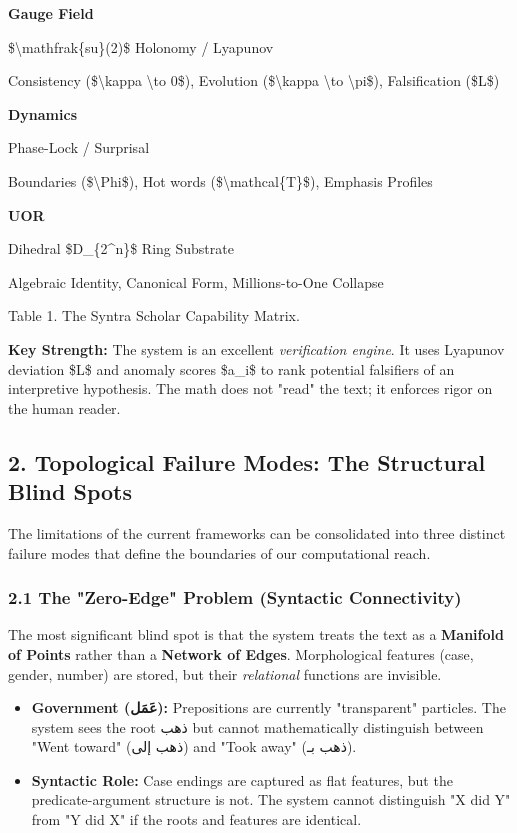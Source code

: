 \documentclass[12pt,a4paper]{article}
\providecommand{\tightlist}{\setlength{\itemsep}{0pt}\setlength{\parskip}{0pt}}
\begin{document}
\textbf{Gauge Field}

\$\textbackslash mathfrak\{su\}(2)\$ Holonomy / Lyapunov

Consistency (\$\textbackslash kappa \textbackslash to 0\$), Evolution
(\$\textbackslash kappa \textbackslash to \textbackslash pi\$),
Falsification (\$L\$)

\textbf{Dynamics}

Phase-Lock / Surprisal

Boundaries (\$\textbackslash Phi\$), Hot words
(\$\textbackslash mathcal\{T\}\$), Emphasis Profiles

\textbf{UOR}

Dihedral \$D\_\{2\^{}n\}\$ Ring Substrate

Algebraic Identity, Canonical Form, Millions-to-One Collapse

Table 1. The Syntra Scholar Capability Matrix.

\textbf{Key Strength:} The system is an excellent \emph{verification
engine}. It uses Lyapunov deviation \$L\$ and anomaly scores \$a\_i\$ to
rank potential falsifiers of an interpretive hypothesis. The math does
not "read" the text; it enforces rigor on the human reader.

\subsection{2. Topological Failure Modes: The Structural Blind
Spots}\label{blind-spots}

The limitations of the current frameworks can be consolidated into three
distinct failure modes that define the boundaries of our computational
reach.

\subsubsection{2.1 The "Zero-Edge" Problem (Syntactic
Connectivity)}\label{the-zero-edge-problem-syntactic-connectivity}

The most significant blind spot is that the system treats the text as a
\textbf{Manifold of Points} rather than a \textbf{Network of Edges}.
Morphological features (case, gender, number) are stored, but their
\emph{relational} functions are invisible.

\begin{itemize}
\tightlist
\item
  \textbf{Government ({عَمَل}):} Prepositions are currently "transparent"
  particles. The system sees the root {ذهب} but cannot mathematically
  distinguish between "Went toward" ({ذهب إلى}) and "Took away" ({ذهب
  بـ}).
\item
  \textbf{Syntactic Role:} Case endings are captured as flat features,
  but the predicate-argument structure is not. The system cannot
  distinguish "X did Y" from "Y did X" if the roots and features are
  identical.
\end{itemize}
\end{document}
